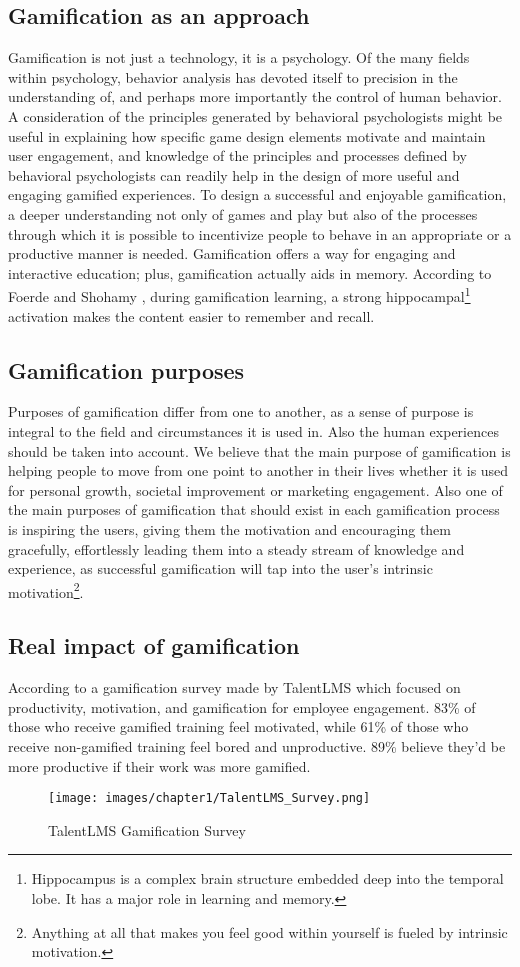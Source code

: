 \documentclass[../main.tex]{subfiles}
\begin{document}
\subsection{Gamification as an approach}
Gamification is not just a technology, it is a psychology. Of the many fields within psychology, behavior analysis has devoted itself to precision in the understanding of, and perhaps more importantly the control of human behavior. A consideration of the principles generated by behavioral psychologists might be useful in explaining how specific game design elements motivate and maintain user engagement, and knowledge of the principles and processes defined by behavioral psychologists can readily help in the design of more useful and engaging gamified experiences. 
To design a successful and enjoyable gamification, a deeper understanding not only of games and play but also of the processes through which it is possible to incentivize people to behave in an appropriate or a productive manner is needed. Gamification offers a way for engaging and interactive education; plus, gamification actually aids in memory. According to Foerde and Shohamy \cite{4}, during gamification learning, a strong hippocampal\footnote{Hippocampus is a complex brain structure embedded deep into the temporal lobe. It has a major role in learning and memory.} activation makes the content easier to remember and recall.

\subsection{Gamification purposes}
Purposes of gamification differ from one to another, as a sense of purpose is integral to the field and circumstances it is used in. Also the human experiences should be taken into account. We believe that the main purpose of gamification is helping people to move from one point to another in their lives whether it is used for personal growth, societal improvement or marketing engagement. Also one of the main purposes of gamification that should exist in each gamification process is inspiring the users, giving them the motivation and encouraging them gracefully, effortlessly leading them into a steady stream of knowledge and experience, as successful gamification will tap into the user’s intrinsic motivation\footnote{Anything at all that makes you feel good within yourself is fueled by intrinsic motivation.}.
\subsection{Real impact of gamification}
According to a gamification survey made by TalentLMS which focused on productivity, motivation, and gamification for employee engagement. 83\% of those who receive gamified training feel motivated, while 61\% of those who receive non-gamified training feel bored and unproductive. 89\% believe they’d be more productive if their work was more gamified. \cite{5}
\begin{figure}[ht]
\centering
\texttt{[image: images/chapter1/TalentLMS\_Survey.png]}
\caption{TalentLMS Gamification Survey}
\label{fig:TalentLMS gamification survey}
\end{figure}
\end{document}
